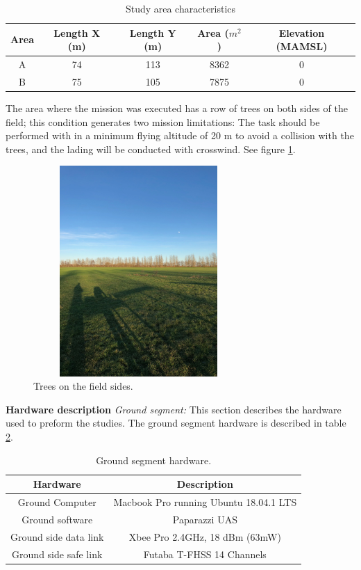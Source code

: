 \begin{table}[H]
\centering
\begin{tabular}{|c|c|c|c|c|}
\hline
Area & Length X (m) & Length Y (m) & Area ($m^2$) & Elevation (MAMSL) \\ \hline
A     & 74           & 113         &  8362     & 0                 \\ \hline
B     & 75           & 105          & 7875      & 0                 \\ \hline
\end{tabular}
\caption{Study area characteristics}
\label{table: Area_char}
\end{table}
The area where the mission was executed has a row of trees on both sides of the field; this condition generates two mission limitations: The task should be performed with in a minimum flying altitude of 20 m to avoid a collision with the trees, and the lading will be conducted with  crosswind. See figure \ref{fig:ARboles}.
\begin{figure}[H]
\centering
\includegraphics[width=8cm,height=8cm,keepaspectratio,angle=-90]{imagenes/IMG_1122.JPG}
\caption{Trees on the field sides.}
\label{fig:ARboles}
\end{figure}
\textbf{Hardware description}\newline
\textit{Ground segment:}
This section describes the hardware used to preform the studies.
The ground segment hardware is described in table \ref{Table:Ground_Hardware}.
\begin{table}[H]
\centering
\begin{tabular}{|c|c|}
\hline
Hardware             & Description                            \\ \hline
Ground Computer      & Macbook Pro running Ubuntu 18.04.1 LTS \\ \hline
Ground software      & Paparazzi UAS                          \\ \hline
Ground side data link & Xbee Pro 2.4GHz, 18 dBm (63mW)         \\ \hline
Ground side safe link  & Futaba T-FHSS 14 Channels               \\ \hline
\end{tabular}
\caption{Ground segment hardware.}
\label{Table:Ground_Hardware}
\end{table}


